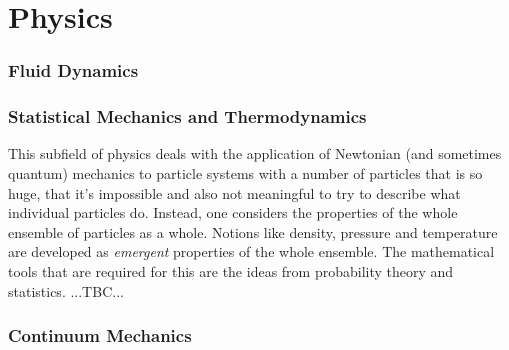 \chapter{Physics}  



\subsection{Fluid Dynamics}







\subsection{Statistical Mechanics and Thermodynamics}
This subfield of physics deals with the application of Newtonian (and sometimes quantum) mechanics to particle systems with a number of particles that is so huge, that it's impossible and also not meaningful to try to describe what individual particles do. Instead, one considers the properties of the whole ensemble of particles as a whole. Notions like density, pressure and temperature are developed as \emph{emergent} properties of the whole ensemble. The mathematical tools that are required for this are the ideas from probability theory and statistics. ...TBC...




\subsection{Continuum Mechanics}

